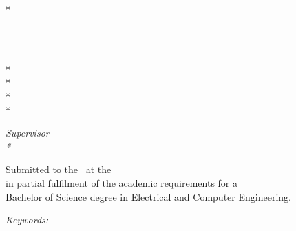 \begin{titlepage}
    \centering
    \vspace*{1cm}

    \begin{Huge}
        \bfseries\titl\par
        \vskip 0.2cm
    \end{Huge}

    \begin{Large}
        \subtitle\\*
        \vskip 2cm
    \end{Large}

    \logo

    \vskip 2cm

    \begin{Large}
        \bfseries\auth\\
    \end{Large}

    \begin{normalsize}
        \vskip 2mm
        \dept\\*
        \uni\\*
        \city\\*
        \country\\*

        \vskip 1cm
    \end{normalsize}

    \begin{normalsize}
        {\itshape Supervisor \\*}
        \supervisor\\
        \vskip 1cm
    \end{normalsize}

    \begin{Large}
        {\bfseries \MonthYear}
        \vskip 0.5cm
    \end{Large}

    Submitted to the \dept\ at the \uni\\
    in partial fulfilment of the academic requirements for a\\
    Bachelor of Science degree in Electrical and Computer Engineering.

    \vskip 0.5cm

    \begin{normalsize}
        {\itshape Keywords:}
        \key
    \end{normalsize}

    \vskip 1cm

    \bottomlogos
\end{titlepage}

